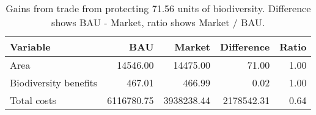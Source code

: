 \begin{table}

\caption{\label{tab:gains-from-trade}Gains from trade from protecting 71.56 units of biodiversity. Difference shows BAU - Market, ratio shows Market / BAU.}
\centering
\begin{tabular}[t]{l|r|r|r|r}
\hline
Variable & BAU & Market & Difference & Ratio\\
\hline
Area & 14546.00 & 14475.00 & 71.00 & 1.00\\
\hline
Biodiversity benefits & 467.01 & 466.99 & 0.02 & 1.00\\
\hline
Total costs & 6116780.75 & 3938238.44 & 2178542.31 & 0.64\\
\hline
\end{tabular}
\end{table}